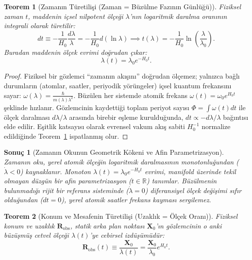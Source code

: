\documentclass[11pt,a4paper]{article}
\newtheorem{theorem}{Teorem}[section]
\newtheorem{corollary}{Sonuç}[theorem]
\begin{document}
\begin{theorem}[Zamanın Türetilişi (Zaman = Büzülme Fazının Günlüğü)]
    \label{thm:zaman_turetilis}
    Fiziksel zaman $t$, maddenin içsel nilpotent ölçeği $\lambda$'nın logaritmik daralma oranının integrali olarak türetilir:
    \begin{equation}
        dt \equiv -\frac{1}{H_0} \frac{d\lambda}{\lambda} = -\frac{1}{H_0} d(\ln \lambda) \implies t(\lambda) = -\frac{1}{H_0} \ln\left(\frac{\lambda}{\lambda_0}\right).
        \label{eq:zaman_turetilis}
    \end{equation}
    Buradan maddenin ölçek evrimi doğrudan çıkar:
    \begin{equation}
        \lambda(t) = \lambda_0 e^{-H_0 t}.
    \end{equation}
\end{theorem}

\begin{proof}
    Fiziksel bir gözlemci ``zamanın akışını'' doğrudan ölçemez; yalnızca bağlı durumların (atomlar, saatler, periyodik yörüngeler) içsel kuantum frekansını sayar: $\omega(\lambda) = \frac{\hbar}{m(\lambda) \lambda^2}$. Büzülen her sistemde atomik frekans $\omega(t) = \omega_0 e^{H_0 t}$ şeklinde hızlanır. Gözlemcinin kaydettiği toplam periyot sayısı $\Phi = \int \omega(t) dt$ ile ölçek daralması $d\lambda/\lambda$ arasında birebir eşleme kurulduğunda, $dt \propto -d\lambda/\lambda$ bağıntısı elde edilir. Eşitlik katsayısı olarak evrensel vakum akış sabiti $H_0^{-1}$ normalize edildiğinde Teorem~\ref{thm:zaman_turetilis} ispatlanmış olur.
\end{proof}

\begin{corollary}[Zamanın Okunun Geometrik Kökeni ve Afin Parametrizasyon]
    \label{cor:zaman_oku_sc}
    Zamanın oku, yerel atomik ölçeğin logaritmik daralmasının monotonluğundan ($\dot{\lambda} < 0$) kaynaklanır. Monoton $\lambda(t) = \lambda_0 e^{-H_0 t}$ evrimi, manifold üzerinde tekil olmayan düzgün bir afin parametrizasyon ($t \in \mathbb{R}$) tanımlar. Büzülmenin bulunmadığı rijit bir referans sisteminde ($\dot{\lambda} = 0$) diferansiyel ölçek değişimi sıfır olduğundan ($dt = 0$), yerel atomik saatler frekans kayması sergilemez.
\end{corollary}

\begin{theorem}[Konum ve Mesafenin Türetilişi (Uzaklık = Ölçek Oranı)]
    \label{thm:konum_turetilis}
    Fiziksel konum ve uzaklık $\mathbf{R}_{\mathrm{obs}}$, statik arka plan noktası $\mathbf{X}_0$'ın gözlemcinin o anki büzüşmüş cetvel ölçeği $\lambda(t)$'ye cebirsel izdüşümüdür:
    \begin{equation}
        \mathbf{R}_{\mathrm{obs}}(t) \equiv \frac{\mathbf{X}_0}{\lambda(t)} = \frac{\mathbf{X}_0}{\lambda_0} e^{H_0 t}.
        \label{eq:konum_turetilis}
    \end{equation}
\end{theorem}
\end{document}
